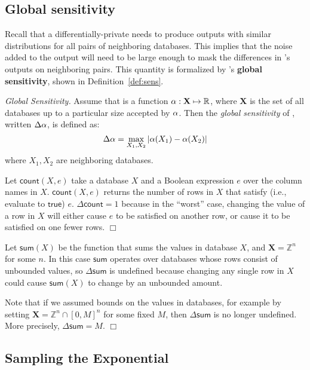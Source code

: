 \documentclass[11pt,twoside]{scrartcl}
\begin{document}
\subsection{Global sensitivity}

Recall that a differentially-private \san needs to produce outputs with similar distributions for all pairs of neighboring databases. This implies that the noise added to the output will need to be large enough to mask the differences in \san's outputs on neighboring pairs. This quantity is formalized by \san's \textbf{global sensitivity}, shown in Definition~\ref{def:sens}.

\begin{definition}{\emph{Global Sensitivity.}}
\label{def:sens}
Assume that \san is a function $\alpha : \mathbf{X} \mapsto \mathbb{R}$, where $\mathbf{X}$ is the set of all databases up to a particular size accepted by $\alpha$. Then the \emph{global sensitivity} of \san, written $\Delta\alpha$, is defined as:
\[
\Delta\alpha = \max\limits_{X_1, X_2} | \alpha(X_1) - \alpha(X_2) |
\]
where $X_1, X_2$ are neighboring databases.
\end{definition}

\begin{example}
Let $\mathsf{count}(X, e)$ take a database $X$ and a Boolean expression $e$ over the column names in $X$. $\mathsf{count}(X, e)$ returns the number of rows in $X$ that satisfy (i.e., evaluate to $\mathsf{true}$) $e$. $\Delta \mathsf{count} = 1$ because in the ``worst'' case, changing the value of a row in $X$ will either cause $e$ to be satisfied on another row, or cause it to be satisfied on one fewer rows.
$\Box$
\end{example}

\begin{example}
Let $\mathsf{sum}(X)$ be the function that sums the values in database $X$, and $\mathbf{X} = \mathbb{Z}^n$ for some $n$. In this case $\mathsf{sum}$ operates over databases whose rows consist of unbounded values, so $\Delta\mathsf{sum}$ is undefined because changing any single row in $X$ could cause $\mathsf{sum}(X)$ to change by an unbounded amount.

Note that if we assumed bounds on the values in databases, for example by setting $\mathbf{X} = \mathbb{Z}^n \cap [0, M]^n$ for some fixed $M$, then $\Delta\mathsf{sum}$ is no longer undefined. More precisely, $\Delta\mathsf{sum} = M$.
$\Box$
\end{example}

\subsection{Sampling the Exponential}
\end{document}
